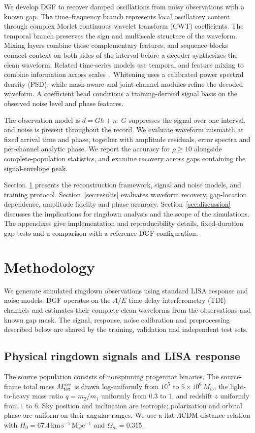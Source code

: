 \documentclass[10pt,prd,aps,a4paper,twocolumn,superscriptaddress,nofootinbib,floatfix]{revtex4-2}
\begin{document}
We develop DGF to recover damped oscillations from noisy observations with a known gap. The time--frequency branch represents local oscillatory content through complex Morlet continuous wavelet transform (CWT) coefficients. The temporal branch preserves the sign and multiscale structure of the waveform. Mixing layers combine these complementary features, and sequence blocks connect context on both sides of the interval before a decoder synthesizes the clean waveform. Related time-series models use temporal and feature mixing to combine information across scales~\cite{TSMixer2023,TimeMixer2024}. Whitening uses a calibrated power spectral density (PSD), while mask-aware and joint-channel modules refine the decoded waveform. A coefficient head conditions a training-derived signal basis on the observed noise level and phase features.

The observation model is $d=Gh+n$: $G$ suppresses the signal over one interval, and noise is present throughout the record. We evaluate waveform mismatch at fixed arrival time and phase, together with amplitude residuals, error spectra and per-channel analytic phase. We report the accuracy for $\rho\ge10$ alongside complete-population statistics, and examine recovery across gaps containing the signal-envelope peak.

Section~\ref{sec:method} presents the reconstruction framework, signal and noise models, and training protocol. Section~\ref{sec:results} evaluates waveform recovery, gap-location dependence, amplitude fidelity and phase accuracy. Section~\ref{sec:discussion} discusses the implications for ringdown analysis and the scope of the simulations. The appendixes give implementation and reproducibility details, fixed-duration gap tests and a comparison with a reference DGF configuration.

\section{Methodology}\label{sec:method}
We generate simulated ringdown observations using standard LISA response and noise models. DGF operates on the $A/E$ time-delay interferometry (TDI) channels and estimates their complete clean waveforms from the observations and known gap mask. The signal, response, noise calibration and preprocessing described below are shared by the training, validation and independent test sets.

\subsection{Physical ringdown signals and LISA response}\label{sec:physical_signals}
The source population consists of nonspinning progenitor binaries. The source-frame total mass $M_{\rm tot}^{\rm src}$ is drawn log-uniformly from $10^5$ to $5\times10^6\,M_\odot$, the light-to-heavy mass ratio $q=m_2/m_1$ uniformly from $0.3$ to $1$, and redshift $z$ uniformly from $1$ to $6$. Sky position and inclination are isotropic; polarization and orbital phase are uniform on their angular ranges. We use a flat $\Lambda$CDM distance relation with $H_0=67.4\,\mathrm{km\,s^{-1}\,Mpc^{-1}}$ and $\Omega_m=0.315$.
\end{document}
